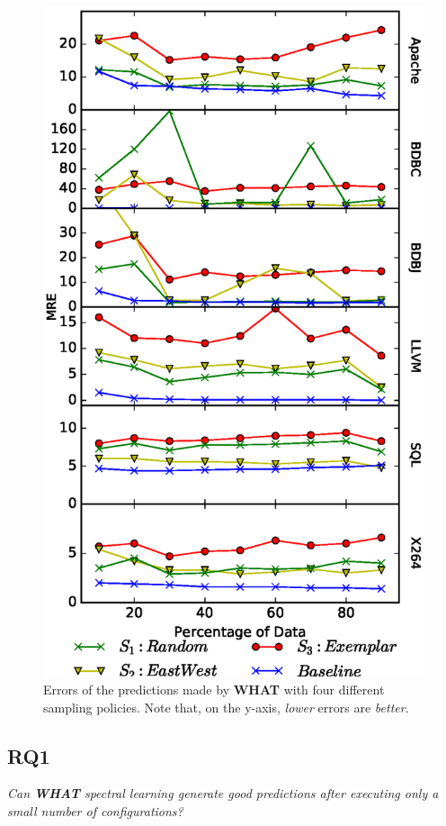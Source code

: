 \documentclass{sig-alternative}
\newcommand{\what}{{\bf WHAT }}
\begin{document}
\begin{figure}[!t]
\includegraphics[width=0.9\linewidth]{Figures/SamplingAccuracy.eps}
\caption{Errors of the predictions made by \what with four different
sampling policies. Note that, on the y-axis,  {\em lower} errors are {\em better}.
}
\label{fig:sampling_accuracy}
\end{figure}

\subsection{RQ1}

\begin{center}
{\em Can  \what spectral learning generate good predictions after
executing only a small number of configurations?}
\end{center}
\end{document}
